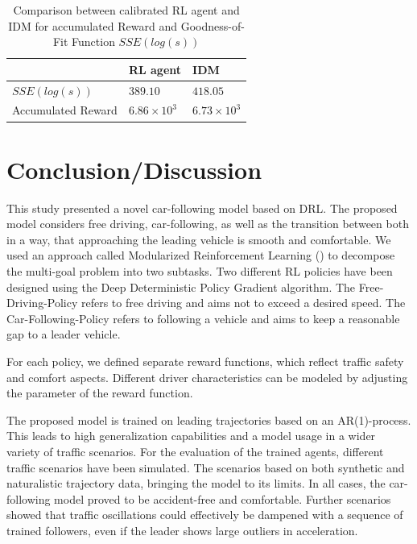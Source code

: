 \documentclass[review]{elsarticle}
\providecommand{\3}{{\ss}}
\begin{document}
\begin{table}
	\caption{Comparison between calibrated RL agent and IDM for accumulated Reward and Goodness-of-Fit Function $SSE(log(s))$} 
	\label{tab:objectiveFunc} 
	\begin{center}
		\begin{tabular}{p{} | p{} p{}  } 
			& RL agent & IDM   \\ \hline
			$SSE(log(s))$ & $389.10$ &  $418.05$	\\
			Accumulated Reward &  $6.86 \times 10^3$   & $6.73\times 10^3$
			
		\end{tabular}
	\end{center}
\end{table}


\section{Conclusion/Discussion}
This study presented a novel car-following model based on DRL. The proposed model considers free driving, car-following, as well as the transition between both in a way, that approaching the leading vehicle is smooth and comfortable. We used an approach called Modularized Reinforcement Learning (\cite{MRL}) to decompose the multi-goal problem into two subtasks. Two different RL policies have been designed using the Deep Deterministic Policy Gradient algorithm. The Free-Driving-Policy refers to free driving and aims not to exceed a desired speed. The Car-Following-Policy refers to following a vehicle and aims to keep a reasonable gap to a leader vehicle.

For each policy, we defined separate reward functions, which reflect traffic safety and comfort aspects. 
Different driver characteristics can be modeled by adjusting the parameter of the reward function.

The proposed model is trained on leading trajectories based on an AR(1)-process. This leads to high generalization capabilities and a model usage in a wider variety of traffic scenarios. 
For the evaluation of the trained agents, different traffic scenarios have been simulated. The scenarios based on both synthetic and naturalistic trajectory data, bringing the model to its limits. 
In all cases, the car-following model proved to be accident-free and comfortable. Further scenarios showed that traffic oscillations could effectively be dampened with a sequence of trained followers, even if the leader shows large outliers in acceleration.





\end{document}
